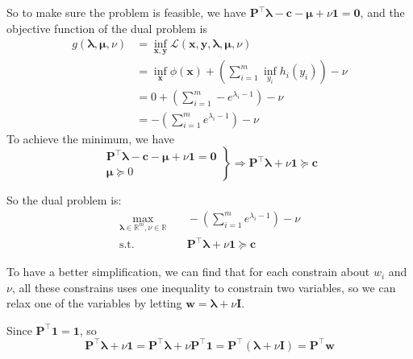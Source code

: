 So to make sure the problem is feasible, we have $\pmb P^{\top}\pmb \lambda - \pmb c - \pmb \mu + \nu\pmb 1 = \pmb 0$, and the objective function of the dual problem is
\begin{align*}
g(\pmb \lambda,\pmb \mu,\nu) &= \inf_{\pmb x,\pmb y} \mathcal{L}(\pmb x,\pmb  y,\pmb \lambda,\pmb \mu,\nu) \\
&= \inf_{\pmb x} \phi(\pmb x) + \left(\sum_{i=1}^m \inf_{y_i} h_i(y_i)\right) - \nu \\
&= 0 + \left(\sum_{i=1}^m -e^{\lambda_i-1} \right) - \nu \\
&= -\left(\sum_{i=1}^m e^{\lambda_i-1} \right) - \nu
\end{align*}
To achieve the minimum, we have
$$\left.\begin{array}{l}
\pmb P^{\top}\pmb \lambda - \pmb c - \pmb \mu + \nu\pmb 1 = \pmb 0 \\
\pmb \mu \succeq 0
\end{array}\right\} \Rightarrow \pmb P^{\top}\pmb \lambda + \nu\pmb 1 \succeq \pmb c$$

So the dual problem is:
\begin{align*}
\max_{\pmb \lambda\in\mathbb{R}^m, \nu\in\mathbb{R}} &\quad -\left(\sum_{i=1}^m e^{\lambda_i-1} \right) - \nu \\
\text{s.t.} &\quad \pmb P^{\top}\pmb \lambda + \nu\pmb 1 \succeq \pmb c
\end{align*}

To have a better simplification, we can find that for each constrain about $w_i$ and $\nu$, all these constrains uses one inequality to constrain two variables, so we can relax one of the variables by letting $\pmb w=\pmb\lambda + \nu\pmb I$.

Since $\pmb P^{\top}\pmb 1=\pmb 1$, so
$$\pmb P^{\top}\pmb \lambda + \nu\pmb 1 = \pmb P^{\top}\pmb \lambda + \nu\pmb P^{\top}\pmb 1 = \pmb P^{\top}\left(\pmb\lambda + \nu\pmb I\right) = \pmb P^{\top}\pmb w$$

